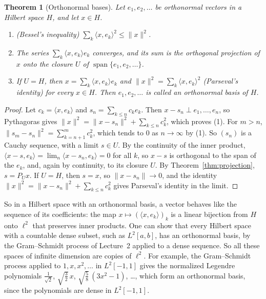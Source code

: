 \documentclass[11pt]{article}
\newcommand{\norm}[1]{\lVert #1 \rVert}
\newcommand{\ip}[2]{\langle #1, #2 \rangle}
\theoremstyle{definition}
\theoremstyle{plain}
\newtheorem{theorem}[definition]{Theorem}
\theoremstyle{remark}
\DeclareMathOperator{\Span}{span}
\begin{document}
\begin{theorem}[Orthonormal bases]\label{thm:onb}
    Let $e_1, e_2, \ldots$ be orthonormal vectors in a Hilbert space $H$, and let $x \in H$.
    \begin{enumerate}
        \item (Bessel's inequality) $\sum_k \ip{x}{e_k}^2 \leq \norm{x}^2$.
        \item The series $\sum_k \ip{x}{e_k}e_k$ converges, and its sum is the orthogonal projection of $x$ onto the closure $U$ of $\Span\{e_1, e_2, \ldots\}$.
        \item If $U = H$, then $x = \sum_k \ip{x}{e_k}e_k$ and $\norm{x}^2 = \sum_k \ip{x}{e_k}^2$ (Parseval's identity) for every $x \in H$. Then $e_1, e_2, \ldots$ is called an orthonormal basis of $H$.
    \end{enumerate}
\end{theorem}

\begin{proof}
    Let $c_k = \ip{x}{e_k}$ and $s_n = \sum_{k \leq n} c_ke_k$. Then $x - s_n \perp e_1, \ldots, e_n$, so Pythagoras gives $\norm{x}^2 = \norm{x - s_n}^2 + \sum_{k \leq n} c_k^2$, which proves (1). For $m > n$, $\norm{s_m - s_n}^2 = \sum_{k=n+1}^m c_k^2$, which tends to $0$ as $n \to \infty$ by (1). So $(s_n)$ is a Cauchy sequence, with a limit $s \in U$. By the continuity of the inner product, $\ip{x - s}{e_k} = \lim_n \ip{x - s_n}{e_k} = 0$ for all $k$, so $x - s$ is orthogonal to the span of the $e_k$, and, again by continuity, to its closure $U$. By Theorem~\ref{thm:projection}, $s = P_Ux$. If $U = H$, then $s = x$, so $\norm{x - s_n} \to 0$, and the identity $\norm{x}^2 = \norm{x - s_n}^2 + \sum_{k \leq n} c_k^2$ gives Parseval's identity in the limit.
\end{proof}

So in a Hilbert space with an orthonormal basis, a vector behaves like the sequence of its coefficients: the map $x \mapsto (\ip{x}{e_k})_k$ is a linear bijection from $H$ onto $\ell^2$ that preserves inner products. One can show that every Hilbert space with a countable dense subset, such as $L^2[a, b]$, has an orthonormal basis, by the Gram--Schmidt process of Lecture~2 applied to a dense sequence. So all these spaces of infinite dimension are copies of $\ell^2$. For example, the Gram--Schmidt process applied to $1, x, x^2, \ldots$ in $L^2[-1, 1]$ gives the normalized Legendre polynomials $\frac{1}{\sqrt{2}}$, $\sqrt{\frac{3}{2}}\,x$, $\sqrt{\frac{5}{8}}\,(3x^2 - 1)$, \ldots, which form an orthonormal basis, since the polynomials are dense in $L^2[-1, 1]$.
\end{document}
